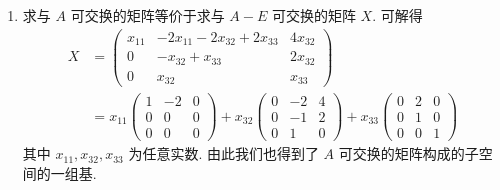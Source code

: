\begin{enumerate}
    \item 求与 $ A $ 可交换的矩阵等价于求与 $ A - E $ 可交换的矩阵 $ X $. 可解得
          \begin{align*}
              X & = \begin{pmatrix}
                        x_{11} & -2x_{11} - 2x_{32} + 2x_{33} & 4x_{32} \\
                        0      & -x_{32} + x_{33}             & 2x_{32} \\
                        0      & x_{32}                       & x_{33}
                    \end{pmatrix} \\
                & = x_{11} \begin{pmatrix}
                               1 & -2 & 0 \\
                               0 & 0  & 0 \\
                               0 & 0  & 0
                           \end{pmatrix}
              + x_{32} \begin{pmatrix}
                           0 & -2 & 4 \\
                           0 & -1 & 2 \\
                           0 & 1  & 0
                       \end{pmatrix}
              + x_{33} \begin{pmatrix}
                           0 & 2 & 0 \\
                           0 & 1 & 0 \\
                           0 & 0 & 1
                       \end{pmatrix}
          \end{align*}
          其中 $ x_{11}, x_{32}, x_{33} $ 为任意实数. 由此我们也得到了 $ A $ 可交换的矩阵构成的子空间的一组基.


\end{enumerate}
